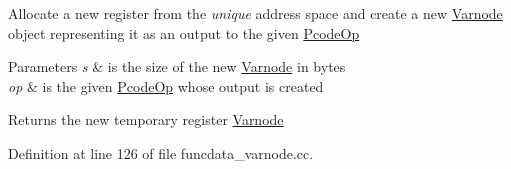 Allocate a new register from the {\itshape unique} address space and create a new \mbox{\hyperlink{class_varnode}{Varnode}} object representing it as an output to the given \mbox{\hyperlink{class_pcode_op}{Pcode\+Op}} 
\begin{DoxyParams}{Parameters}
{\em s} & is the size of the new \mbox{\hyperlink{class_varnode}{Varnode}} in bytes \\
\hline
{\em op} & is the given \mbox{\hyperlink{class_pcode_op}{Pcode\+Op}} whose output is created \\
\hline
\end{DoxyParams}
\begin{DoxyReturn}{Returns}
the new temporary register \mbox{\hyperlink{class_varnode}{Varnode}} 
\end{DoxyReturn}


Definition at line 126 of file funcdata\+\_\+varnode.\+cc.

